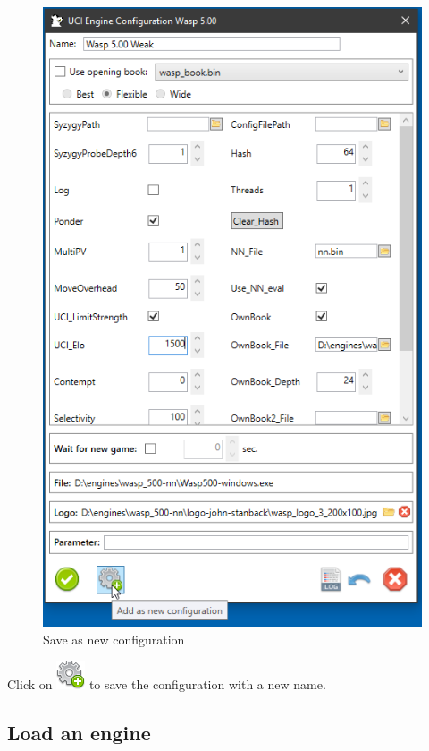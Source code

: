 \documentclass[11pt,a4paper]{article}
\begin{document}
\begin{figure}[H]
	\centering
	\includegraphics[scale=0.8]{ConfigureWasp_2.png}
	\caption{Save as new configuration}
	\label{fig:LoadEngine3}
\end{figure}
Click on \includegraphics[scale=0.5]{cog_add.png} to save the configuration with a new name.\\


\subsection{Load an engine}
\end{document}
